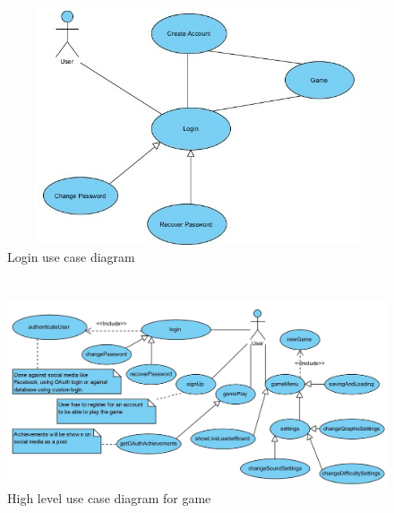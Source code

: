 \documentclass[letterpaper]{article}
\begin{document}
		\begin{figure}[H]
		\centering
		\includegraphics[width=180mm, height=70mm]{UML_Diagram/Use_Case/login_simple}
		\caption{Login use case diagram}
		\label{overflow}
		\end{figure}		
				
		\vspace{0.2in}
		
		\section*{\colorbox{blue}{}} 
				
		\begin{figure}[ht!]
		\centering
		\includegraphics[width=180mm]{UML_Diagram/Use_Case/high_level_use_case_diagram}
		\caption{High level use case diagram for game}
		\label{overflow}
		\end{figure}
		
		\vspace{0.2in}
		
\end{document}
